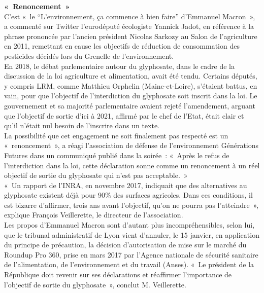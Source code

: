 \documentclass[8pt]{article}
\begin{document}
\newpage
\textbf{«~Renoncement~»}\\

C’est «~le “L’environnement, ça commence à bien faire” d’Emmanuel Macron~», a commenté sur Twitter l’eurodéputé écologiste Yannick Jadot, en référence à la phrase prononcée par l’ancien président Nicolas Sarkozy au Salon de l’agriculture en 2011, remettant en cause les objectifs de réduction de consommation des pesticides décidés lors du Grenelle de l’environnement.\\

En 2018, le débat parlementaire autour du glyphosate, dans le cadre de la discussion de la loi agriculture et alimentation, avait été tendu. Certains députés, y compris LRM, comme Matthieu Orphelin (Maine-et-Loire), s’étaient battus, en vain, pour que l’objectif de l’interdiction du glyphosate soit inscrit dans la loi. Le gouvernement et sa majorité parlementaire avaient rejeté l’amendement, arguant que l’objectif de sortie d’ici à 2021, affirmé par le chef de l’Etat, était clair et qu’il n’était nul besoin de l’inscrire dans un texte.\\

La possibilité que cet engagement ne soit finalement pas respecté est un «~renoncement~», a réagi l’association de défense de l’environnement Générations Futures dans un communiqué publié dans la soirée~: «~Après le refus de l’interdiction dans la loi, cette déclaration sonne comme un renoncement à un réel objectif de sortie du glyphosate qui n’est pas acceptable.~»\\

«~Un rapport de l’INRA, en novembre 2017, indiquait que des alternatives au glyphosate existent déjà pour 90\% des surfaces agricoles. Dans ces conditions, il est bizarre d’affirmer, trois ans avant l’objectif, qu’on ne pourra pas l’atteindre~», explique François Veillerette, le directeur de l’association.\\

Les propos d’Emmanuel Macron sont d’autant plus incompréhensibles, selon lui, que le tribunal administratif de Lyon vient d’annuler, le 15 janvier, en application du principe de précaution, la décision d’autorisation de mise sur le marché du Roundup Pro 360, prise en mars 2017 par l’Agence nationale de sécurité sanitaire de l’alimentation, de l’environnement et du travail (Anses). «~Le président de la République doit revenir sur ses déclarations et réaffirmer l’importance de l’objectif de sortie du glyphosate~», conclut M. Veillerette.
\end{document}
